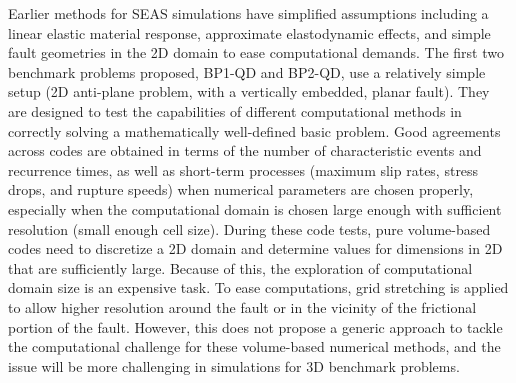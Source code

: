 Earlier methods for SEAS simulations have simplified assumptions including a linear elastic material response, approximate elastodynamic effects, and simple fault geometries in the 2D domain to ease computational demands.
The first two benchmark problems proposed, BP1-QD and BP2-QD, use a relatively simple setup (2D anti-plane problem, with a vertically embedded, planar fault).
They are designed to test the capabilities of different computational methods in correctly solving a mathematically well-defined basic problem.
Good agreements across codes are obtained in terms of the number of characteristic events and recurrence times, as well as short-term processes (maximum slip rates, stress drops, and rupture speeds) when numerical parameters are chosen properly, especially when the computational domain is chosen large enough with sufficient resolution (small enough cell size).
During these code tests, pure volume-based codes need to discretize a 2D domain and determine values for dimensions in 2D that are sufficiently large. Because of this, the exploration of computational domain size is an expensive task.
To ease computations, grid stretching is applied to allow higher resolution around the fault or in the vicinity of the frictional portion of the fault.
However, this does not propose a generic approach to tackle the computational challenge for these volume-based numerical methods, and the issue will be more challenging in simulations for 3D benchmark problems.